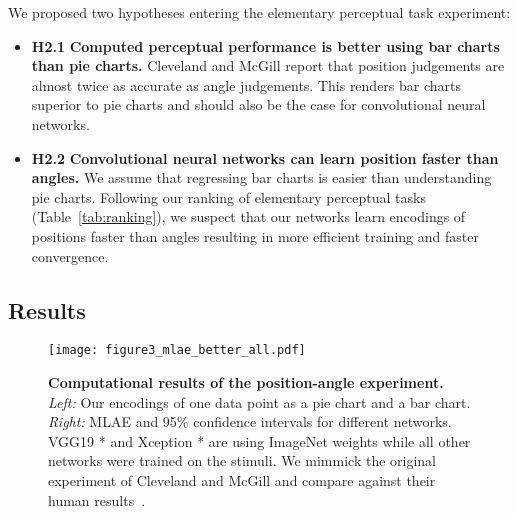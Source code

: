 We proposed two hypotheses entering the elementary perceptual task experiment:

\begin{itemize}
	\item \textbf{H2.1} \textbf{Computed perceptual performance is better using bar charts than pie charts.} Cleveland and McGill report that position judgements are almost twice as accurate as angle judgements. This renders bar charts superior to pie charts and should also be the case for convolutional neural networks.
	\item \textbf{H2.2} \textbf{Convolutional neural networks can learn position faster than angles.} We assume that regressing bar charts is easier than understanding pie charts. Following our ranking of elementary perceptual tasks (Table~\ref{tab:ranking}), we suspect that our networks learn encodings of positions faster than angles resulting in more efficient training and faster convergence.
\end{itemize}

\subsection{Results}

\begin{figure}[t]
	\centering
	  \texttt{[image: figure3\_mlae\_better\_all.pdf]}
  \caption{\textbf{Computational results of the position-angle experiment.} \textit{Left:} Our encodings of one data point as a pie chart and a bar chart. \textit{Right:} MLAE and 95\% confidence intervals for different networks. VGG19 * and Xception * are using ImageNet weights while all other networks were trained on the stimuli. We mimmick the original experiment of Cleveland and McGill and compare against their human results~\cite{cleveland_mcgill}.}
	\label{fig:figure3_mlae}
\end{figure}


